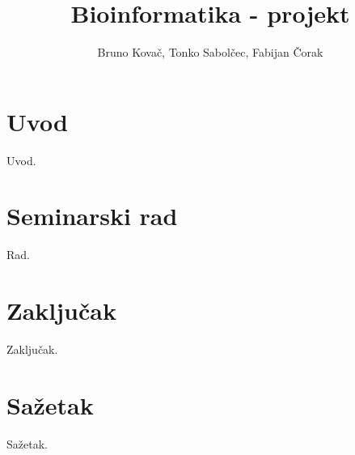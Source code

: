 \documentclass[times, utf8, seminar, numeric]{fer}
\begin{document}
\nocite{*}

\title{Bioinformatika - projekt}

\author{Bruno Kovač, Tonko Sabolčec, Fabijan Čorak}


\maketitle

\tableofcontents

\chapter{Uvod}
Uvod.

\chapter{Seminarski rad}
Rad.

\chapter{Zaključak}
Zaključak.




\chapter{Sažetak}
Sažetak.
\end{document}

